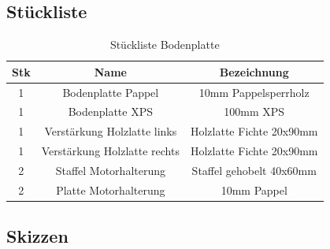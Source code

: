 \subsection{Stückliste}
\begin{table}[H]
    \centering
    \begin{tabular}{|c|c|c|}
        \hline
        \textbf{Stk} & \textbf{Name} & \textbf{Bezeichnung}\\\hline
        1 & Bodenplatte Pappel & 10mm Pappelsperrholz\\\hline
        1 & Bodenplatte XPS & 100mm XPS\\\hline
        1 & Verstärkung Holzlatte links & Holzlatte Fichte 20x90mm\\\hline
        1 & Verstärkung Holzlatte rechts & Holzlatte Fichte 20x90mm\\\hline
        2 & Staffel Motorhalterung & Staffel gehobelt 40x60mm\\\hline
        2 & Platte Motorhalterung & 10mm Pappel\\\hline
    \end{tabular}
    \caption{Stückliste Bodenplatte}
    \label{tab:konst:bodenplatte:stueckliste}
\end{table}

\subsection{Skizzen}